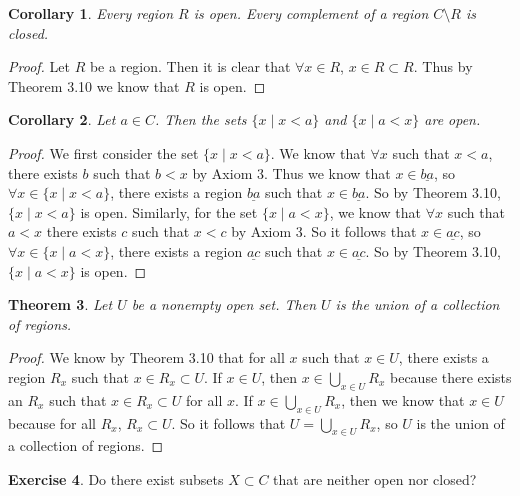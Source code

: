 \documentclass[12pt]{article}
\renewcommand{\_}[1]{\underline{ #1 }}
\newtheorem{theorem}{Theorem}[section]
\newtheorem{corollary}[theorem]{Corollary}
\theoremstyle{definition}
\newtheorem{exercise}[theorem]{Exercise}
\numberwithin{equation}{subsection}
\begin{document}
\begin{corollary}  Every region $R$ is open.  Every complement of a region $C \setminus R$ is closed.
\end{corollary}

\begin{proof}
Let $R$ be a region. Then it is clear that $\forall x \in R$, $x \in R \subset R$. Thus by Theorem 3.10 we know that $R$ is open.
\end{proof}

\begin{corollary}  Let $a \in C$.  Then the sets $\{ x \mid x < a\}$ and $\{x \mid a < x \}$ are open.
\end{corollary}

\begin{proof}
We first consider the set $\{ x \mid x < a\}$. We know that $\forall x$ such that $x < a$, there exists $b$ such that $b < x$ by Axiom 3. Thus we know that $x \in \underline{ba}$, so $\forall x \in \{ x \mid x < a\}$, there exists a region $\underline{ba}$ such that $x \in \underline{ba}$. So by Theorem 3.10, $\{ x \mid x < a\}$ is open.
Similarly, for the set $\{ x \mid a < x\}$, we know that $\forall x$ such that $a < x$ there exists $c$ such that $x < c$ by Axiom 3. So it follows that $x \in \underline{ac}$, so $\forall x \in \{ x \mid a < x\}$, there exists a region $\underline{ac}$ such that $x \in \underline{ac}$. So by Theorem 3.10, $\{ x \mid a < x\}$ is open.
\end{proof}

\begin{theorem}\label{union}  Let $U$ be a nonempty open set.  Then $U$ is the union of a collection of regions.  
\end{theorem}

\begin{proof}
We know by Theorem 3.10 that for all $x$ such that $x \in U$, there exists a region $R_x$ such that $x \in R_x \subset U$. If $x \in U$, then $x \in \bigcup_{x \in U} R_x$ because there exists an $R_x$ such that $x \in R_x \subset U$ for all $x$. If $x \in \bigcup_{x \in U} R_x$, then we know that $x \in U$ because for all $R_x$, $R_x \subset U$. So it follows that $U = \bigcup_{x \in U} R_x$, so $U$ is the union of a collection of regions.
\end{proof}

\begin{exercise}  Do there exist subsets $X \subset C$ that are neither open nor closed?
\end{exercise}
\end{document}
